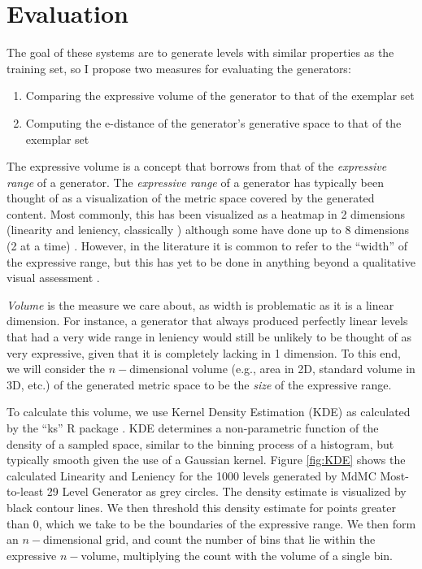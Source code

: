 \documentclass[12pt]{report}
\begin{document}
\section*{Evaluation}

The goal of these systems are to generate levels with similar properties as the training set, so I propose two measures for evaluating the generators:

\begin{enumerate}
\item Comparing the expressive volume of the generator to that of the exemplar set
\item Computing the e-distance of the generator's generative space to that of the exemplar set
\end{enumerate}

The expressive volume is a concept that borrows from that of the \textit{expressive range} of a generator. The \textit{expressive range} \cite{smith2010analyzing} of a generator has typically been thought of as a visualization of the metric space covered by the generated content.  Most commonly, this has been visualized as a heatmap in 2 dimensions (linearity and leniency, classically \cite{van2013designing,snodgrass2015hierarchical}) although some have done up to 8 dimensions (2 at a time) \cite{summerville2016mariostring}.  However, in the literature it is common to refer to the ``width'' of the expressive range, but this has yet to be done in anything beyond a qualitative visual assessment \cite{smith2011launchpad}.  


\textit{Volume} is the measure we care about, as width is problematic as it is a linear dimension.  For instance, a generator that always produced perfectly linear levels that had a very wide range in leniency would still be unlikely to be thought of as very expressive, given that it is completely lacking in 1 dimension.  To this end, we will consider the $n-$dimensional volume (e.g., area in 2D, standard volume in 3D, etc.) of the generated metric space to be the \textit{size} of the expressive range.


To calculate this volume, we use Kernel Density Estimation (KDE) as calculated by the ``ks'' R package \cite{ks}.  KDE determines a non-parametric function of the density of a sampled space, similar to the binning process of a histogram, but typically smooth given the use of a Gaussian kernel.  Figure \ref{fig:KDE} shows the calculated Linearity and Leniency for the 1000 levels generated by MdMC Most-to-least 29 Level Generator as grey circles.  The density estimate is visualized by black contour lines.  We then threshold this density estimate for points greater than 0, which we take to be the boundaries of the expressive range.  We then form an $n-$dimensional grid, and count the number of bins that lie within the expressive $n-$volume, multiplying the count with the volume of a single bin.
\end{document}
